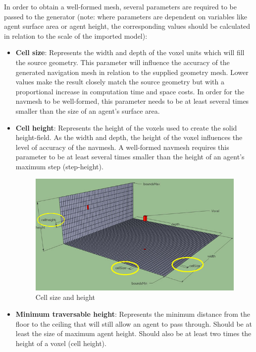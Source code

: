 In order to obtain a well-formed mesh, several parameters are required to be passed to the generator (note: where parameters are dependent on variables like agent surface area or agent height, the corresponding values should be calculated in relation to the scale of the imported model):
\begin{itemize}
  \item\textbf{Cell size}: Represents the width and depth of the voxel units which will fill the source geometry. This parameter will influence the accuracy of the generated navigation mesh in relation to the supplied geometry mesh. Lower values make the result closely match the source geometry but with a proportional increase in computation time and space costs. In order for the navmesh to be well-formed, this parameter needs to be at least several times smaller than the size of an agent's surface area.
  
  \item\textbf{Cell height}: Represents the height of the voxels used to create the solid height-field. As the width and depth, the height of the voxel influences the level of accuracy of the navmesh. A well-formed navmesh requires this parameter to be at least several times smaller than the height of an agent's maximum step (step-height).
  
\begin{figure}[H]
	\centering
	\includegraphics[width=1\textwidth]{../images/cell_size_height.png}
	\caption{Cell size and height}
\end{figure}   

  
  \item\textbf{Minimum traversable height}: Represents the minimum distance from the floor to the ceiling that will still allow an agent to pass through. Should be at least the size of maximum agent height. Should also be at least two times the height of a voxel (cell height).
  

\end{itemize}
